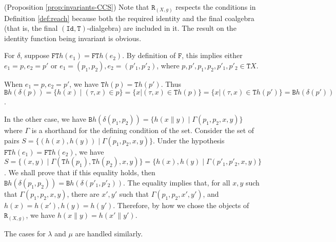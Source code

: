 \documentclass[orivec]{llncs}
\newcommand{\mC}[1]{\mathtt{#1}}
\newcommand{\mF}[1]{\mathtt{#1}}
\newcommand{\Id}{\mF{Id}}
\newcommand{\F}{\mF{F}}
\newcommand{\B}{\mF{B}}
\newcommand{\T}{\mF{T}}
\newcommand{\reach}{\mC{R}}
\newcommand{\proend}{\medskip}
\renewenvironment{proof}{\begin{pro}}{\proend\end{pro}}
\begin{document}
\begin{proof}(Proposition \ref{prop:invariants-CCS})
	Note that $\reach_{(X,g)}$ respects the conditions in Definition \ref{def:reach} because both the required identity and the final coalgebra (that is, the final $(\Id, \T)$-dialgebra) are included in it. The result on the identity function being invariant is obvious. 
	
	For $\delta$, suppose $\F \T h (e_1) = \F \T h (e_2)$. By definition of $\F$, this implies either $e_1 = p, e_2 = p'$ or $e_1 = (p_1,p_2), e_2 = (p'_1,p'_2)$, where $p,p',p_1,p_2,p'_1,p'_2 \in \T X$.
	
	When $e_1 = p, e_2 = p'$, we have $\T h (p) = \T h (p')$. Thus $\B h (\delta(p)) = \{ h(x) \mid (\tau,x) \in p \} = \{ x | (\tau, x) \in \T h (p) \} = \{ x | (\tau, x) \in \T h (p') \} = \B h (\delta(p'))$. 
	
	In the other case, we have $\B h (\delta (p_1,p_2)) = \{ h(x \parallel y ) \mid \Gamma(p_1,p_2,x,y) \}$ where $\Gamma$ is a shorthand for the defining condition of the set. Consider the set of pairs $S = \{ (h(x),h(y)) \mid \Gamma (p_1,p_2,x,y) \}$.  Under the hypothesis $\F \T h (e_1) = \F \T h (e_2)$, we have $S = \{ (x,y) \mid \Gamma (\T h (p_1),\T h (p_2), x, y) \} = \{ h(x), h(y) \mid \Gamma(p'_1,p'_2,x,y) \}$. We shall prove that if this equality holds, then $\B h (\delta(p_1,p_2)) = \B h (\delta(p'_1,p'_2))$. The equality implies that, for all $x,y$ such that $\Gamma(p_1,p_2,x,y)$, there are $x',y'$ such that $\Gamma(p_1,p_2,x',y')$, and $h(x)=h(x'),h(y)=h(y')$. Therefore, by how we chose the objects of $\reach_{(X,g)}$, we have $h(x\parallel y) = h(x' \parallel y')$. 
	
	The cases for $\lambda$ and $\mu$ are handled similarly.
\end{proof}
\end{document}

